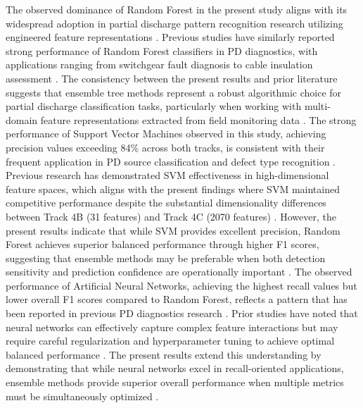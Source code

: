 The observed dominance of Random Forest in the present study aligns with its widespread adoption in partial discharge pattern recognition research utilizing engineered feature representations \parencite{Govindarajan_2023_1, Aldosari_2023}. Previous studies have similarly reported strong performance of Random Forest classifiers in PD diagnostics, with applications ranging from switchgear fault diagnosis to cable insulation assessment \parencite{Govindarajan_2021_3, Seitz_2024_1}. The consistency between the present results and prior literature suggests that ensemble tree methods represent a robust algorithmic choice for partial discharge classification tasks, particularly when working with multi-domain feature representations extracted from field monitoring data \parencite{Aldosari_2023, Long_2024}. The strong performance of Support Vector Machines observed in this study, achieving precision values exceeding 84\% across both tracks, is consistent with their frequent application in PD source classification and defect type recognition \parencite{Govindarajan_2021_3, Aldosari_2023}. Previous research has demonstrated SVM effectiveness in high-dimensional feature spaces, which aligns with the present findings where SVM maintained competitive performance despite the substantial dimensionality differences between Track 4B (31 features) and Track 4C (2070 features) \parencite{Govindarajan_2023_1, Zemouri_2023_1}. However, the present results indicate that while SVM provides excellent precision, Random Forest achieves superior balanced performance through higher F1 scores, suggesting that ensemble methods may be preferable when both detection sensitivity and prediction confidence are operationally important \parencite{Govindarajan_2023_1, Adhikari_2024}. The observed performance of Artificial Neural Networks, achieving the highest recall values but lower overall F1 scores compared to Random Forest, reflects a pattern that has been reported in previous PD diagnostics research \parencite{Srivastava_2023_1, Aldosari_2023}. Prior studies have noted that neural networks can effectively capture complex feature interactions but may require careful regularization and hyperparameter tuning to achieve optimal balanced performance \parencite{Aldosari_2023, Zemouri_2023_1}. The present results extend this understanding by demonstrating that while neural networks excel in recall-oriented applications, ensemble methods provide superior overall performance when multiple metrics must be simultaneously optimized \parencite{Govindarajan_2023_1, Srivastava_2023_1}.

